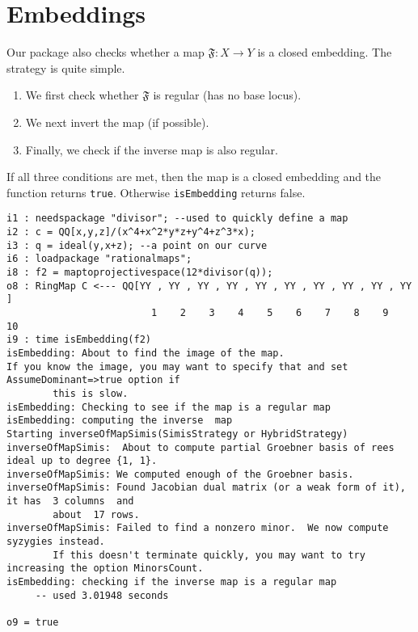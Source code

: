 \documentclass[11pt]{amsart}
\numberwithin{equation}{theorem}
\renewcommand{\:}{\colon}
\theoremstyle{theorem}
\begin{document}
{\normalsize
\section{Embeddings}

Our package also checks whether a map $\mathfrak{F} : X \to Y$ is a closed embedding.  The strategy is quite simple.  
\begin{enumerate}
\item  We first check whether $\mathfrak{F}$ is regular (has no base locus).
\item  We next invert the map (if possible).
\item  Finally, we check if the inverse map is also regular.  
\end{enumerate}
If all three conditions are met, then the map is a closed embedding and the function returns {\tt true}.  Otherwise {\tt isEmbedding} returns false.  
}
{\scriptsize
\begin{verbatim}
i1 : needspackage "divisor"; --used to quickly define a map
i2 : c = QQ[x,y,z]/(x^4+x^2*y*z+y^4+z^3*x);
i3 : q = ideal(y,x+z); --a point on our curve
i6 : loadpackage "rationalmaps";
i8 : f2 = maptoprojectivespace(12*divisor(q));
o8 : RingMap C <--- QQ[YY , YY , YY , YY , YY , YY , YY , YY , YY , YY  ]
                         1    2    3    4    5    6    7    8    9    10
i9 : time isEmbedding(f2)
isEmbedding: About to find the image of the map.
If you know the image, you may want to specify that and set AssumeDominant=>true option if 
        this is slow.
isEmbedding: Checking to see if the map is a regular map
isEmbedding: computing the inverse  map
Starting inverseOfMapSimis(SimisStrategy or HybridStrategy)
inverseOfMapSimis:  About to compute partial Groebner basis of rees ideal up to degree {1, 1}.
inverseOfMapSimis: We computed enough of the Groebner basis.
inverseOfMapSimis: Found Jacobian dual matrix (or a weak form of it), it has  3 columns  and 
        about  17 rows.
inverseOfMapSimis: Failed to find a nonzero minor.  We now compute syzygies instead.
        If this doesn't terminate quickly, you may want to try increasing the option MinorsCount.
isEmbedding: checking if the inverse map is a regular map
     -- used 3.01948 seconds

o9 = true
\end{verbatim}
}
\end{document}
